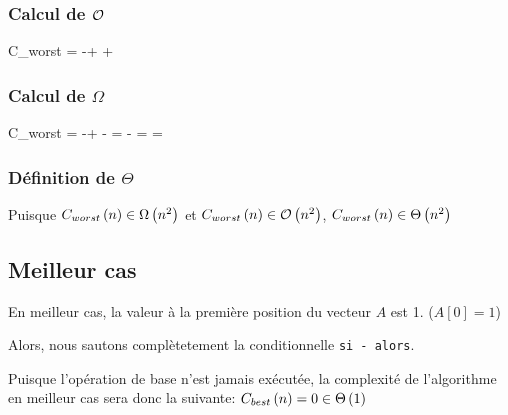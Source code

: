 \documentclass[class=article]{standalone}
\begin{document}
\subsubsection*{Calcul de $\mathcal{O}$}
\begin{deriv}
    C_{worst}
    \<=
    -+
    \<\leq
    +
    \<\in
    \BigO{}
\end{deriv}

\subsubsection*{Calcul de $\Omega$}
\begin{deriv}
    C_{worst}
    \<=
    -+
    \<\geq
    -
    \<= 
    -
    \<= 
    \<\geq 
    \<=
    \<\in
    \Omega{}
\end{deriv}

\subsubsection*{Définition de $\Theta$}
Puisque $C_{worst}\left ( n \right ) \in \Omega\left ( n^2 \right )$ et $C_{worst}\left ( n \right ) \in \mathcal{O}\left ( n^2 \right )$,
$C_{worst}\left ( n \right ) \in \Theta\left ( n^2 \right )$

\subsection*{Meilleur cas}

En meilleur cas, la valeur à la première position du vecteur $A$ est 1. ($A[0] = 1$)

Alors, nous sautons complètetement la conditionnelle \lstinline{si - alors}.

Puisque l'opération de base n'est jamais exécutée,
la complexité de l'algorithme en meilleur cas sera donc la suivante:
$C_{best}\left ( n \right ) = 0 \in \Theta\left ( 1 \right )$
\end{document}
